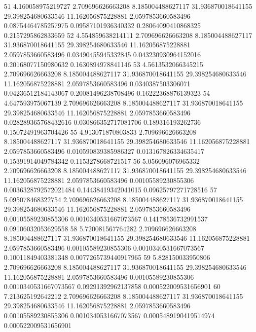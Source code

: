 {51 4.160058975219727 2.709696626663208 8.185004488627117 31.936870018641155 29.398254680633546 11.162056875228881 2.0597853660583496 0.08754464785257975 0.09587101936340332 0.28064090410868325 0.2157295862833659
52 4.554859638214111 2.709696626663208 8.185004488627117 31.936870018641155 29.398254680633546 11.162056875228881 2.0597853660583496 0.03490455945332845 0.043230930964152016 0.20168077150980632 0.1630894978841146
53 4.5613532066345215 2.709696626663208 8.185004488627117 31.936870018641155 29.398254680633546 11.162056875228881 2.0597853660583496 0.0340387503306071 0.04236512184143067 0.20081496238708496 0.16222368876139323
54 4.647593975067139 2.709696626663208 8.185004488627117 31.936870018641155 29.398254680633546 11.162056875228881 2.0597853660583496 0.028289365768432616 0.030866352717081706 0.189316193262736 0.15072491963704426
55 4.913071870803833 2.709696626663208 8.185004488627117 31.936870018641155 29.398254680633546 11.162056875228881 2.0597853660583496 0.010590839385986327 0.013167826334635417 0.15391914049784342 0.1153278668721517
56 5.056096076965332 2.709696626663208 8.185004488627117 31.936870018641155 29.398254680633546 11.162056875228881 2.0597853660583496 0.00105589230855306 0.0036328792572021484 0.14438419342041015 0.09625797271728516
57 5.095078468322754 2.709696626663208 8.185004488627117 31.936870018641155 29.398254680633546 11.162056875228881 2.0597853660583496 0.00105589230855306 0.0010340531667073567 0.14178536732991537 0.09106032053629558
58 5.720081567764282 2.709696626663208 8.185004488627117 31.936870018641155 29.398254680633546 11.162056875228881 2.0597853660583496 0.00105589230855306 0.0010340531667073567 0.10011849403381348 0.0077265739440917965
59 5.828150033950806 2.709696626663208 8.185004488627117 31.936870018641155 29.398254680633546 11.162056875228881 2.0597853660583496 0.00105589230855306 0.0010340531667073567 0.09291392962137858 0.000522009531656901
60 7.213625192642212 2.709696626663208 8.185004488627117 31.936870018641155 29.398254680633546 11.162056875228881 2.0597853660583496 0.00105589230855306 0.0010340531667073567 0.0005489190419514974 0.000522009531656901
}\tableexpivwaitagripred
